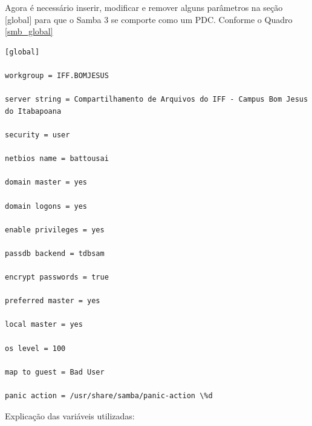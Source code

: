 Agora é necessário inserir, modificar e remover alguns parâmetros na seção [global] para que o Samba 3 se comporte como um PDC. Conforme o Quadro \ref{smb_global}\\

\begin{lstlisting}[caption=Exemplo do que deve ser inserido no smb.conf para o Samba 3 como controlador de domínio,label={smb_global}]
[global] 

workgroup = IFF.BOMJESUS

server string = Compartilhamento de Arquivos do IFF - Campus Bom Jesus do Itabapoana

security = user

netbios name = battousai

domain master = yes

domain logons = yes

enable privileges = yes

passdb backend = tdbsam
	
encrypt passwords = true

preferred master = yes

local master = yes

os level = 100

map to guest = Bad User

panic action = /usr/share/samba/panic-action \%d	
\end{lstlisting}

Explicação das variáveis utilizadas:


